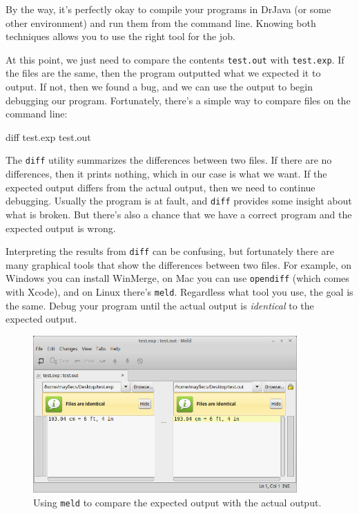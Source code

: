 By the way, it's perfectly okay to compile your programs in DrJava (or some other environment) and run them from the command line.
Knowing both techniques allows you to use the right tool for the job.

At this point, we just need to compare the contents {\tt test.out} with {\tt test.exp}.
If the files are the same, then the program outputted what we expected it to output.
If not, then we found a bug, and we can use the output to begin debugging our program.
Fortunately, there's a simple way to compare files on the command line:

\begin{stdout}
diff test.exp test.out
\end{stdout}

The {\tt diff} utility summarizes the differences between two files.
If there are no differences, then it prints nothing, which in our case is what we want.
If the expected output differs from the actual output, then we need to continue debugging.
Usually the program is at fault, and {\tt diff} provides some insight about what is broken.
But there's also a chance that we have a correct program and the expected output is wrong.

Interpreting the results from {\tt diff} can be confusing, but fortunately there are many graphical tools that show the differences between two files.
For example, on Windows you can install WinMerge, on Mac you can use {\tt opendiff} (which comes with Xcode), and on Linux there's {\tt meld}.
Regardless what tool you use, the goal is the same.
Debug your program until the actual output is {\it identical} to the expected output.

\begin{figure}[!h]
\begin{center}
\includegraphics[width=0.9\textwidth]{figs/meld.png}
\caption{Using {\tt meld} to compare the expected output with the actual output.}
\end{center}
\end{figure}



